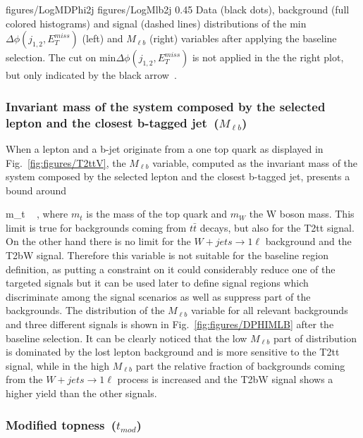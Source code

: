                  {figures/LogMDPhi2j} %
                 {figures/LogMlb2j} %
                 {0.45}       %
                 { Data (black dots), background (full colored histograms) and signal (dashed lines) distributions of the min$\Delta \phi (j_{1,2}, E_{T}^{miss})$ (left) and $M_{\ell b}$ (right) variables after applying the baseline selection. The cut on min$\Delta \phi (j_{1,2}, E_{T}^{miss})$  is not applied in the the right plot, but only indicated by the black arrow~\cite{website:stopSupp}. }

\subsubsection{Invariant mass of the system composed by the selected lepton and the closest b-tagged jet~($M_{\ell b}$)}

When a lepton and a b-jet originate from a one top quark as displayed in Fig.~\ref{fig:figures/T2ttV}, the $M_{\ell b}$ variable, computed as the invariant mass of the system composed by the selected lepton and the closest b-tagged jet, presents a bound around

{
 m_{t}  ~ ,
}
where $m_{t}$ is the mass of the top quark and $m_{W}$ the W boson mass. This limit is true for backgrounds coming from $t\bar{t}$ decays, but also for the T2tt signal. On the other hand there is no limit for the $W+jets \to 1\ell$  background and the T2bW signal. Therefore this variable is not suitable for the baseline region definition, as putting a constraint on it could considerably reduce one of the targeted signals but it can be used later to define signal regions which discriminate among the signal scenarios as well as suppress part of the backgrounds. The distribution of the  $M_{\ell b}$ variable for all relevant backgrounds and three different signals is shown in Fig.~\ref{fig:figures/DPHIMLB} after the baseline selection. It can be clearly noticed that the low $M_{\ell b}$ part of distribution is dominated by the lost lepton background and is more sensitive to the T2tt signal, while in  the high $M_{\ell b}$ part the relative fraction of backgrounds coming from the $W+jets \to 1\ell$ process is increased and the T2bW  signal shows a higher yield than the other signals.

\subsubsection{Modified topness~($t_{mod}$)}

